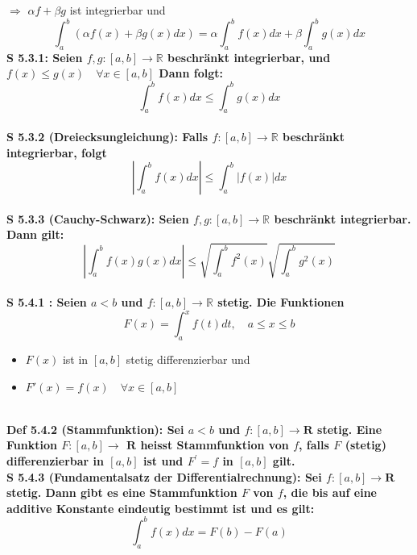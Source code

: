 \documentclass[7pt,landscape, margin = 0.1mm]{article}
\newcommand{\DEF}[2]{\color{chaptercolor}\bf{Def #1}:\color{black}    \hspace{0.2cm} #2 \\}
\newcommand{\SA}[2]{\color{chaptercolor}\bf{S #1}:\color{black}    \hspace{0.2cm} #2 \\}
\begin{document}
\begin{multicols}{4}
\begin{flushleft}
{$\Rightarrow$ $\alpha f+ \beta g$ ist integrierbar und
$$ \int_{a}^{b} \left(\alpha f(x)+\beta g(x) dx \right) = \alpha\int_{a}^{b} f(x) dx + \beta \int_{a}^{b} g(x) dx  $$}
\SA{5.3.1}{Seien $f,g:[a,b] \longrightarrow \mathbb{R}$ beschränkt integrierbar, und $f(x) \leq g(x) \quad \forall x \in [a,b]$
Dann folgt:
$$ \int_{a}^{b} f(x)dx \leq \int_{a}^{b} g(x)dx $$}
\SA{5.3.2 (Dreiecksungleichung)}{Falls $f:[a,b] \longrightarrow \mathbb{R}$ beschränkt integrierbar, folgt
$$ \left| \int_{a}^{b} f(x)dx \right| \leq \int_{a}^{b} |f(x)|dx $$}
\SA{5.3.3 (Cauchy-Schwarz)}{Seien $f,g:[a,b] \longrightarrow \mathbb{R}$ beschränkt integrierbar. Dann gilt:
$$ \left| \int_{a}^{b}f(x)g(x)dx \right| \leq \sqrt{ \int_{a}^{b} f^2(x) } \sqrt{\int_{a}^{b} g^2(x)} $$}
\SA{5.4.1 }{Seien $a<b$ und $f:[a,b] \longrightarrow \mathbb{R}$ stetig. Die Funktionen
$$ F(x) = \int_{a}^{x} f(t) dt, \quad a\leq x \leq b $$
\begin{itemize}
\item $F(x)$ ist in $[a,b]$ stetig differenzierbar und
\item $F'(x) = f(x) \quad \forall x \in [a,b]$\end{itemize}}
\DEF{5.4.2 (Stammfunktion)}{Sei $a<b$ und $f:[a, b] \longrightarrow \mathbf{R}$ stetig. Eine Funktion $F:[a, b] \longrightarrow$ $\mathbf{R}$ heisst Stammfunktion von $f$, falls $F$ (stetig) differenzierbar in $[a, b]$ ist und $F^{\prime}=f$ in $[a, b]$ gilt.}
\SA{5.4.3 (Fundamentalsatz der Differentialrechnung)}{Sei $f:[a, b] \longrightarrow \mathbf{R}$ stetig. Dann gibt es eine Stammfunktion $F$ von $f$, die bis auf eine additive Konstante eindeutig bestimmt ist und es gilt:
$$
\int_a^b f(x) d x=F(b)-F(a)
$$}


\end{flushleft}
\end{multicols}
\end{document}
